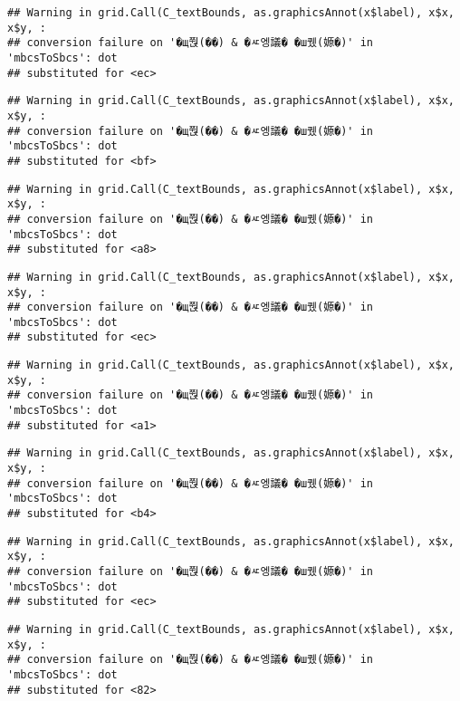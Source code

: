 \documentclass[
]{article}
\begin{document}
\begin{verbatim}
## Warning in grid.Call(C_textBounds, as.graphicsAnnot(x$label), x$x, x$y, :
## conversion failure on '�щ쭩(��) & �ㅼ엥議� �ш퀬(嫄�)' in 'mbcsToSbcs': dot
## substituted for <ec>
\end{verbatim}

\begin{verbatim}
## Warning in grid.Call(C_textBounds, as.graphicsAnnot(x$label), x$x, x$y, :
## conversion failure on '�щ쭩(��) & �ㅼ엥議� �ш퀬(嫄�)' in 'mbcsToSbcs': dot
## substituted for <bf>
\end{verbatim}

\begin{verbatim}
## Warning in grid.Call(C_textBounds, as.graphicsAnnot(x$label), x$x, x$y, :
## conversion failure on '�щ쭩(��) & �ㅼ엥議� �ш퀬(嫄�)' in 'mbcsToSbcs': dot
## substituted for <a8>
\end{verbatim}

\begin{verbatim}
## Warning in grid.Call(C_textBounds, as.graphicsAnnot(x$label), x$x, x$y, :
## conversion failure on '�щ쭩(��) & �ㅼ엥議� �ш퀬(嫄�)' in 'mbcsToSbcs': dot
## substituted for <ec>
\end{verbatim}

\begin{verbatim}
## Warning in grid.Call(C_textBounds, as.graphicsAnnot(x$label), x$x, x$y, :
## conversion failure on '�щ쭩(��) & �ㅼ엥議� �ш퀬(嫄�)' in 'mbcsToSbcs': dot
## substituted for <a1>
\end{verbatim}

\begin{verbatim}
## Warning in grid.Call(C_textBounds, as.graphicsAnnot(x$label), x$x, x$y, :
## conversion failure on '�щ쭩(��) & �ㅼ엥議� �ш퀬(嫄�)' in 'mbcsToSbcs': dot
## substituted for <b4>
\end{verbatim}

\begin{verbatim}
## Warning in grid.Call(C_textBounds, as.graphicsAnnot(x$label), x$x, x$y, :
## conversion failure on '�щ쭩(��) & �ㅼ엥議� �ш퀬(嫄�)' in 'mbcsToSbcs': dot
## substituted for <ec>
\end{verbatim}

\begin{verbatim}
## Warning in grid.Call(C_textBounds, as.graphicsAnnot(x$label), x$x, x$y, :
## conversion failure on '�щ쭩(��) & �ㅼ엥議� �ш퀬(嫄�)' in 'mbcsToSbcs': dot
## substituted for <82>
\end{verbatim}
\end{document}
